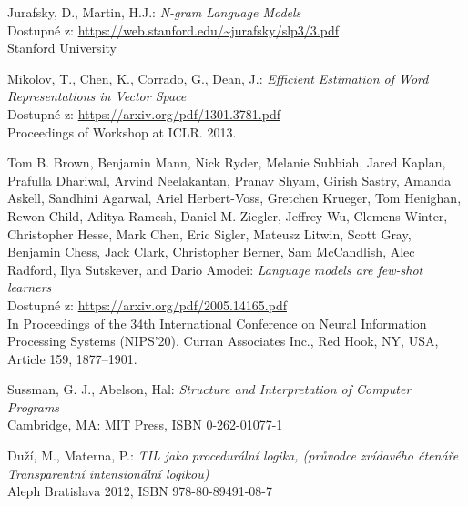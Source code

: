 \documentclass[czech,master]{diploma}
\begin{document}
\MakeTitlePages

\listoffigures
\clearpage

\listoftables
\clearpage









\renewcommand{\bibname}{Zdroje}
\begin{thebibliography}{50}

Jurafsky, D., Martin, H.J.: \textit{N-gram Language Models}\\
Dostupné z: \url{https://web.stanford.edu/~jurafsky/slp3/3.pdf}\\
Stanford University

Mikolov, T., Chen, K., Corrado, G., Dean, J.: \textit{Efficient Estimation of Word Representations in Vector Space}\\
Dostupné z: \url{https://arxiv.org/pdf/1301.3781.pdf}\\
Proceedings of Workshop at ICLR. 2013.

Tom B. Brown, Benjamin Mann, Nick Ryder, Melanie Subbiah, Jared Kaplan, Prafulla Dhariwal, Arvind Neelakantan, Pranav Shyam, Girish Sastry, Amanda Askell, Sandhini Agarwal, Ariel Herbert-Voss, Gretchen Krueger, Tom Henighan, Rewon Child, Aditya Ramesh, Daniel M. Ziegler, Jeffrey Wu, Clemens Winter, Christopher Hesse, Mark Chen, Eric Sigler, Mateusz Litwin, Scott Gray, Benjamin Chess, Jack Clark, Christopher Berner, Sam McCandlish, Alec Radford, Ilya Sutskever, and Dario Amodei: \textit{Language models are few-shot learners}\\
Dostupné z: \url{https://arxiv.org/pdf/2005.14165.pdf}\\
In Proceedings of the 34th International Conference on Neural Information Processing Systems (NIPS'20). Curran Associates Inc., Red Hook, NY, USA, Article 159, 1877–1901.

Sussman, G. J., Abelson, Hal: \textit{Structure and Interpretation of Computer Programs} \\
Cambridge, MA: MIT Press, ISBN 0-262-01077-1

Duží, M., Materna, P.: \textit{TIL jako procedurální logika, (průvodce zvídavého čtenáře Transparentní intensionální logikou)} \\
Aleph Bratislava 2012, ISBN 978-80-89491-08-7


\end{thebibliography}
\end{document}
